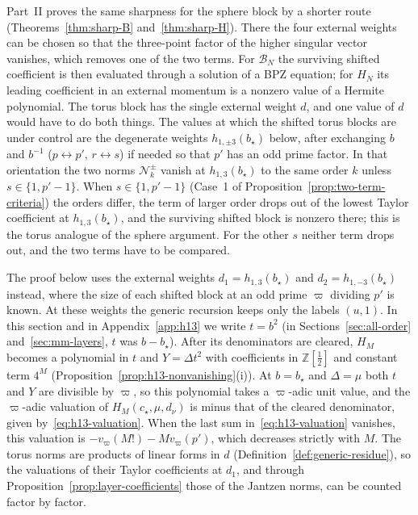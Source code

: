 \documentclass[twoside,10pt]{article}
\numberwithin{equation}{section}
\theoremstyle{slbody}
\theoremstyle{definition}
\theoremstyle{remark}
\begin{document}
Part~II proves the same sharpness for the sphere block by a shorter route
(Theorems~\ref{thm:sharp-B} and~\ref{thm:sharp-H}).  There the four external
weights can be chosen so that the three-point factor of the higher singular
vector vanishes, which removes one of the two terms.  For \(\mathcal B_N\) the
surviving shifted coefficient is then evaluated through a solution of a BPZ
equation; for \(H_N\) its leading coefficient in an external momentum is a
nonzero value of a Hermite polynomial.  The torus block has the single
external weight \(d\), and one value of \(d\) would have to do both things.
The values at which the shifted torus blocks are under control are the
degenerate weights \(h_{1,\pm3}(b_\star)\) below, after exchanging \(b\) and
\(b^{-1}\) (\(p\leftrightarrow p'\), \(r\leftrightarrow s\)) if needed so that
\(p'\) has an odd prime factor.  In that orientation the two norms
\(\mathcal N^\pm_k\) vanish at \(h_{1,3}(b_\star)\) to the same order \(k\)
unless \(s\in\{1,p'-1\}\).  When \(s\in\{1,p'-1\}\) (Case~1 of
Proposition~\ref{prop:two-term-criteria}) the orders differ, the term of
larger order drops out of the lowest Taylor coefficient at
\(h_{1,3}(b_\star)\), and the surviving shifted block is nonzero there; this
is the torus analogue of the sphere argument.  For the other \(s\) neither
term drops out, and the two terms have to be compared.

The proof below uses the external weights \(d_1=h_{1,3}(b_\star)\) and
\(d_2=h_{1,-3}(b_\star)\) instead, where the size of each shifted block at an
odd prime \(\varpi\) dividing \(p'\) is known.  At these weights the generic
recursion keeps only the labels \((u,1)\).  In this section and in
Appendix~\ref{app:h13} we write \(t=b^2\) (in Sections~\ref{sec:all-order}
and~\ref{sec:mm-layers}, \(t\) was \(b-b_\star\)).  After its denominators are
cleared, \(H_M\) becomes a polynomial in \(t\) and \(Y=\Delta t^2\) with
coefficients in \(\mathbb Z[\frac12]\) and constant term \(4^M\)
(Proposition~\ref{prop:h13-nonvanishing}(i)).  At \(b=b_\star\) and
\(\Delta=\mu\) both \(t\) and \(Y\) are divisible by \(\varpi\), so this
polynomial takes a \(\varpi\)-adic unit value, and the \(\varpi\)-adic
valuation of \(H_M(c_\star,\mu,d_\nu)\) is minus that of the cleared
denominator, given by~\eqref{eq:h13-valuation}.  When the last sum in~\eqref{eq:h13-valuation}
vanishes, this valuation is \(-v_\varpi(M!)-Mv_\varpi(p')\), which decreases strictly
with \(M\).  The torus norms are products of linear forms in \(d\)
(Definition~\ref{def:generic-residue}), so the valuations of their Taylor
coefficients at \(d_1\), and through Proposition~\ref{prop:layer-coefficients}
those of the Jantzen norms, can be counted factor by factor.
\end{document}
